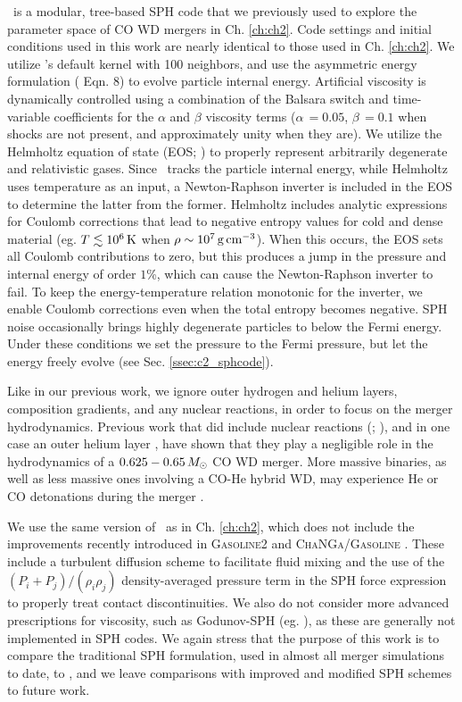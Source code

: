 \gasoline\ is a modular, tree-based SPH code that we previously used to explore the parameter space of CO WD mergers in Ch. \ref{ch:ch2}.  Code settings and initial conditions used in this work are nearly identical to those used in Ch. \ref{ch:ch2}.  We utilize \gasoline's default \cite{hernk89} kernel with 100 neighbors, and use the asymmetric energy formulation (\citeauthor{wadssq04} Eqn. 8) to evolve particle internal energy.  Artificial viscosity is dynamically controlled using a combination of the Balsara switch and time-variable coefficients for the $\alpha$ and $\beta$ viscosity terms ($\alpha\,=0.05$, $\beta\,=0.1$ when shocks are not present, and approximately unity when they are).  We utilize the Helmholtz equation of state (EOS; \citealt{timms00}) to properly represent arbitrarily degenerate and relativistic gases.  Since \gasoline\ tracks the particle internal energy, while Helmholtz uses temperature as an input, a Newton-Raphson inverter is included in the EOS to determine the latter from the former.  {\charles Helmholtz includes analytic expressions for Coulomb corrections that lead to negative entropy values for cold and dense material (eg. $T\lesssim10^6\,\mathrm{K}$ when $\rho\sim10^7\,\gcc$).  When this occurs, the EOS sets all Coulomb contributions to zero, but this produces a jump in the pressure and internal energy of order $1$\%, which can cause the Newton-Raphson inverter to fail.}  To keep the energy-temperature relation monotonic for the inverter, we enable Coulomb corrections even when the total entropy becomes negative.  SPH noise occasionally brings highly degenerate particles to below the Fermi energy.  Under these conditions we set the pressure to the Fermi pressure, but let the energy freely evolve (see Sec. \ref{ssec:c2_sphcode}).

Like in our previous work, we ignore outer hydrogen and helium layers, composition gradients, and any nuclear reactions, in order to focus on the merger hydrodynamics.  Previous work that did include nuclear reactions (\citeal{loreig09}; \citealt{dan+12}), and in one case an outer helium layer \citep{rask+12}, have shown that they play a negligible role in the hydrodynamics of a $0.625 - 0.65\,\Msun$ CO WD merger.  More massive binaries, as well as less massive ones involving a CO-He hybrid WD, may experience He or CO detonations during the merger \citep{pakm+10, rask+12, dan+12, pakm+13}.

We use the same version of \gasoline\ as in Ch. \ref{ch:ch2}, which does not include the improvements recently introduced in \textsc{Gasoline2} \citep{kell+15, tamb+15} and \textsc{ChaNGa/Gasoline} \citep{gove+15}.  These include a turbulent diffusion scheme to facilitate fluid mixing \citep{shen+10} and the use of the $(P_i + P_j)/(\rho_i\rho_j)$ density-averaged pressure term in the SPH force expression \citep{kell+14} to properly treat contact discontinuities.  We also do not consider more advanced prescriptions for viscosity, such as Godunov-SPH (eg. \citealt{chaw16}), as these are generally not implemented in SPH codes.  We again stress that the purpose of this work is to compare the traditional SPH formulation, used in almost all merger simulations to date, to \arepo, and we leave comparisons with improved and modified SPH schemes to future work.

